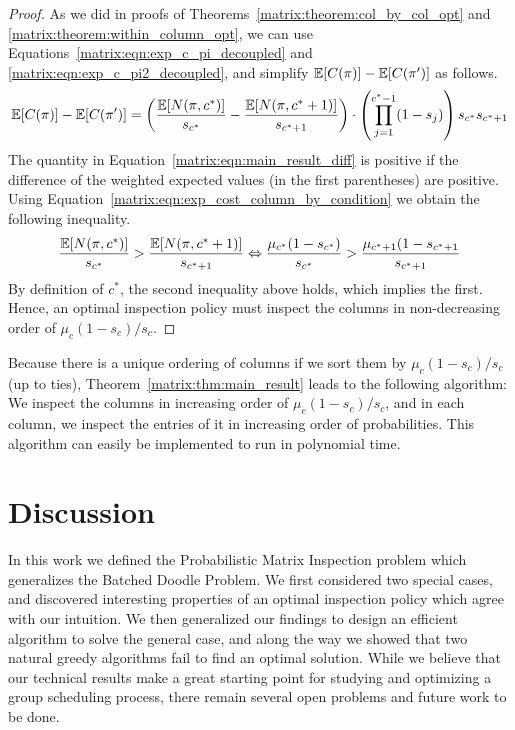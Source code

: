 \begin{proof}
 	As we did in proofs of Theorems~\ref{matrix:theorem:col_by_col_opt} and \ref{matrix:theorem:within_column_opt}, we can use Equations~\ref{matrix:eqn:exp_c_pi_decoupled} and \ref{matrix:eqn:exp_c_pi2_decoupled}, and simplify $\mathbb{E}[C(\pi)] - \mathbb{E}[C(\pi')]$ as follows.
	\small
 	\begin{equation} \label{matrix:eqn:main_result_diff}
 		\mathbb{E}[C(\pi)] - \mathbb{E}[C(\pi')] =  \left(\frac{\mathbb{E}[N(\pi, c^*)]}{s_{c^*}}  - \frac{\mathbb{E}[N(\pi, c^*+1)]}{s_{c^*+1}} \right)  \cdot \left( \prod_{j=1}^{c^*-1} (1 - s_j)\right) s_{c^*} s_{c^*+1}
 	\end{equation}	
	\normalsize
 	The quantity in Equation~\ref{matrix:eqn:main_result_diff} is positive if the difference of the weighted expected values (in the first parentheses) are positive. Using Equation~\ref{matrix:eqn:exp_cost_column_by_condition} we obtain the following inequality.
 	\begin{equation*}
 		\frac{\mathbb{E}[N(\pi, c^*)]}{s_{c^*}}  > \frac{\mathbb{E}[N(\pi, c^*+1)]}{s_{c^*+1}} 
 		\Leftrightarrow 
 		\frac{\mu_{c^*} (1 - s_{c^*})}{s_{c^*}} > \frac{\mu_{c^*+1}(1 - s_{c^*+1}}{s_{c^*+1}}
 	\end{equation*}
 	By definition of $c^*$, the second inequality above holds, which implies the first. Hence, an optimal inspection policy must inspect the columns in non-decreasing order of $\mu_c(1 - s_c)/s_c$. 
 \end{proof}
 Because there is a unique ordering of columns if we sort them by $\mu_c(1-s_c)/s_c$ (up to ties), Theorem~\ref{matrix:thm:main_result} leads to the following algorithm: We inspect the columns in increasing order of $\mu_c(1-s_c)/s_c$, and in each column, we inspect the entries of it in increasing order of probabilities. 
 This algorithm can easily be implemented to run in polynomial time. 


\section{Discussion} \label{matrix:sec:discussion}
In this work we defined the Probabilistic Matrix Inspection problem which generalizes the Batched Doodle Problem.
We first considered two special cases, and discovered interesting properties of an optimal inspection policy which agree with our intuition. We then generalized our findings to design an efficient algorithm to solve the general case, and along the way we showed that two natural greedy algorithms fail to find an optimal solution. While we believe that our technical results make a great starting point for studying and optimizing a group scheduling process, there remain several open problems and future work to be done.

